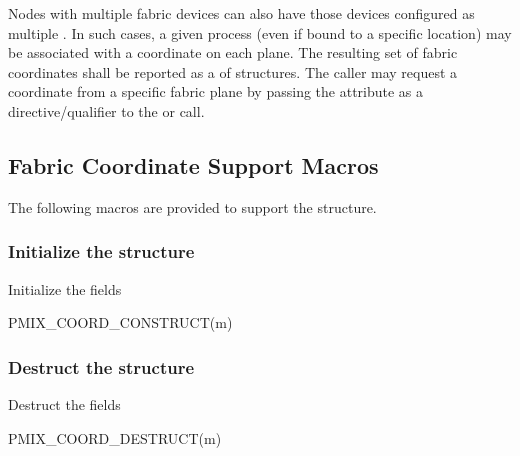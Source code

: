 Nodes with multiple fabric devices can also have those devices configured as multiple . In such cases, a given process (even if bound to a specific location) may be associated with a coordinate on each plane. The resulting set of fabric coordinates shall be reported as a  of  structures. The caller may request a coordinate from a specific fabric plane by passing the  attribute as a directive/qualifier to the  or  call.

\subsection{Fabric Coordinate Support Macros}
\label{api:netcoord:macros}

The following macros are provided to support the  structure.

\subsubsection{Initialize the  structure}

Initialize the  fields

\cspecificstart
\begin{codepar}
PMIX_COORD_CONSTRUCT(m)
\end{codepar}
\cspecificend

\begin{arglist}
\end{arglist}

\subsubsection{Destruct the  structure}

Destruct the  fields

\cspecificstart
\begin{codepar}
PMIX_COORD_DESTRUCT(m)
\end{codepar}
\cspecificend

\begin{arglist}
\end{arglist}

